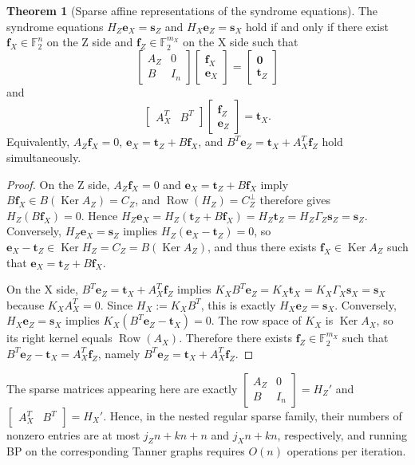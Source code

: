 \documentclass[11pt]{article}
\theoremstyle{definition}
\newtheorem{theorem}{Theorem}[section]
\newcommand{\F}{\mathbb F}
\newcommand{\Row}{\operatorname{Row}}
\newcommand{\Ker}{\operatorname{Ker}}
\newcommand{\be}{\mathbf e}
\newcommand{\bs}{\mathbf s}
\newcommand{\bt}{\mathbf t}
\newcommand{\bff}{\mathbf f}
\newcommand{\CZ}{C_Z}
\begin{document}
\begin{theorem}[Sparse affine representations of the syndrome equations]\label{prop:lifted-bp-jp}
The syndrome equations \(H_Z\be_X=\bs_Z\) and \(H_X\be_Z=\bs_X\) hold if and only if there exist \(\bff_X\in\F_2^n\) on the Z side and \(\bff_Z\in\F_2^{m_X}\) on the X side such that
\[
\begin{bmatrix}
A_Z & 0\\
B & I_n
\end{bmatrix}
\begin{bmatrix}
\bff_X\\
\be_X
\end{bmatrix}
=
\begin{bmatrix}
\mathbf 0\\
\bt_Z
\end{bmatrix}
\]
and
\[
\begin{bmatrix}
A_X^T & B^T
\end{bmatrix}
\begin{bmatrix}
\bff_Z\\
\be_Z
\end{bmatrix}
=
\bt_X.
\]
Equivalently, \(A_Z\bff_X=0\), \(\be_X=\bt_Z+B\bff_X\), and \(B^T\be_Z=\bt_X+A_X^T\bff_Z\) hold simultaneously.
\end{theorem}

\begin{proof}
On the Z side, \(A_Z\bff_X=0\) and \(\be_X=\bt_Z+B\bff_X\) imply \(B\bff_X\in B(\Ker A_Z)=\CZ\), and \(\Row(H_Z)=\CZ^\perp\) therefore gives \(H_Z(B\bff_X)=0\). Hence \(H_Z\be_X=H_Z(\bt_Z+B\bff_X)=H_Z\bt_Z=H_Z\Gamma_Z\bs_Z=\bs_Z\). Conversely, \(H_Z\be_X=\bs_Z\) implies \(H_Z(\be_X-\bt_Z)=0\), so \(\be_X-\bt_Z\in\Ker H_Z=\CZ=B(\Ker A_Z)\), and thus there exists \(\bff_X\in\Ker A_Z\) such that \(\be_X=\bt_Z+B\bff_X\).

On the X side, \(B^T\be_Z=\bt_X+A_X^T\bff_Z\) implies \(K_XB^T\be_Z=K_X\bt_X=K_X\Gamma_X\bs_X=\bs_X\) because \(K_XA_X^T=0\). Since \(H_X:=K_XB^T\), this is exactly \(H_X\be_Z=\bs_X\). Conversely, \(H_X\be_Z=\bs_X\) implies \(K_X(B^T\be_Z-\bt_X)=0\). The row space of \(K_X\) is \(\Ker A_X\), so its right kernel equals \(\Row(A_X)\). Therefore there exists \(\bff_Z\in\F_2^{m_X}\) such that \(B^T\be_Z-\bt_X=A_X^T\bff_Z\), namely \(B^T\be_Z=\bt_X+A_X^T\bff_Z\).
\end{proof}

The sparse matrices appearing here are exactly \(\begin{bmatrix}A_Z&0\\ B&I_n\end{bmatrix}=H_Z'\) and \(\begin{bmatrix}A_X^T&B^T\end{bmatrix}=H_X'\). Hence, in the nested regular sparse family, their numbers of nonzero entries are at most \(j_Zn+kn+n\) and \(j_Xn+kn\), respectively, and running BP on the corresponding Tanner graphs requires \(O(n)\) operations per iteration.
\end{document}
